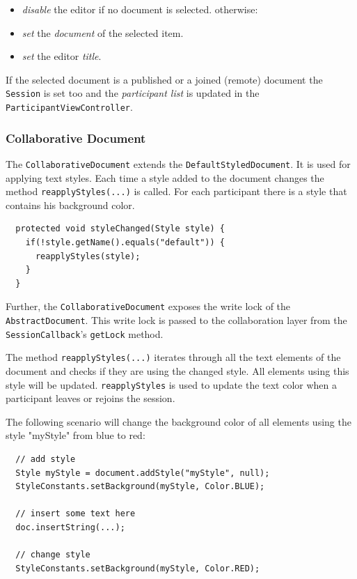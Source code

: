 \begin{itemize}
\item \emph{disable} the editor if no document is selected. otherwise:
\item \emph{set} the \emph{document} of the selected item.
\item \emph{set} the editor \emph{title}.
\end{itemize}

If the selected document is a published or a joined (remote) document the \texttt{Session} is set too and the \emph{participant list} is updated in the \texttt{Participant\-View\-Controller}.

\subsubsection{Collaborative Document}
\label{applicationlayer_collabdocument}

The \texttt{Collaborative\-Document} extends the \texttt{Default\-Styled\-Document}. It is used for applying text styles. Each time a style added to the document changes the method \texttt{reapplyStyles(...)} is called. For each
participant there is a style that contains his background color.

\begin{verbatim}
  protected void styleChanged(Style style) {
    if(!style.getName().equals("default")) {
      reapplyStyles(style);
    }
  }
\end{verbatim}

Further, the \texttt{Collaborative\-Document} exposes the write lock of
the \texttt{Abstract\-Document}. This write lock is passed to the
collaboration layer from the \texttt{Session\-Callback}'s \texttt{get\-Lock}
method.

The method \texttt{reapplyStyles(...)} iterates through all the text elements of the document and checks if they are using the changed style. All elements using this style will be updated. \texttt{reapplyStyles} is used to update the text color when a participant leaves or rejoins the session. 

The following scenario will change the background color of all elements using the style "myStyle" from blue to red:
\begin{verbatim}
  // add style
  Style myStyle = document.addStyle("myStyle", null);
  StyleConstants.setBackground(myStyle, Color.BLUE);
  
  // insert some text here
  doc.insertString(...);
  
  // change style
  StyleConstants.setBackground(myStyle, Color.RED);
\end{verbatim}


